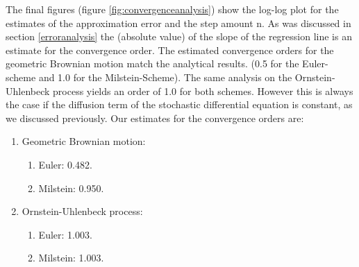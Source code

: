The final figures (figure \ref{fig:convergenceanalysis}) show the log-log plot for the estimates of the approximation error and the step amount n. As was discussed in section \ref{erroranalysis} the (absolute value) of the slope of the regression line is an estimate for the convergence order.
The estimated convergence orders for the geometric Brownian motion match the analytical results. (0.5 for the Euler-scheme and 1.0 for the Milstein-Scheme). The same analysis on the Ornstein-Uhlenbeck process yields an order of 1.0 for both schemes.
However this is always the case if the diffusion term of the stochastic differential equation is constant, as we discussed previously. 
Our estimates for the convergence orders are:
\begin{enumerate}[noitemsep,topsep=0mm,labelindent=6mm,leftmargin=*,widest=3.,align=right]
\item Geometric Brownian motion:
\begin{enumerate}[noitemsep,topsep=0mm,labelindent=6mm,leftmargin=*,widest=3.,align=right]
\item Euler: 0.482.
\item Milstein: 0.950. 
\end{enumerate}
\item Ornstein-Uhlenbeck process:
\begin{enumerate}[noitemsep,topsep=0mm,labelindent=6mm,leftmargin=*,widest=3.,align=right]
\item Euler: 1.003.
\item Milstein: 1.003.
\end{enumerate}
\end{enumerate}

